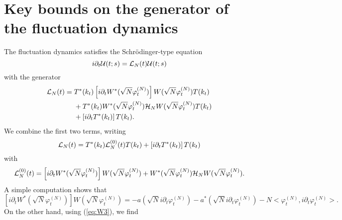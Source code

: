 \documentclass[11pt,a4paper]{article}
\newcommand{\done}{}
\newcommand{\cU}{{\cal U}}
\newcommand{\cH}{{\cal H}}
\newcommand{\cL}{{\cal L}}
\newcommand{\scal}[2]{\big<#1,#2\big>} %
\renewcommand{\Im}{\operatorname{Im}\,} 	%
\newcommand{\ph}{\varphi_t^{(N)}}	%
\begin{document}
\section{Key bounds on the generator of the fluctuation dynamics}
\label{sec:gen-fd}

The fluctuation dynamics satisfies the Schr\"odinger-type equation
\[ i\partial_t \cU (t;s) = \cL_N (t) \cU (t;s) \]
with the generator
\[ \begin{split} \cL_N (t) = \; &T^* (k_t) \left[ i \partial_t W^* (\sqrt{N} \varphi_t^{(N)}) \right] W(\sqrt{N} \varphi_t^{(N)}) T (k_t) \\ &+ T^* (k_t) W^* (\sqrt{N} \varphi_t^{(N)}) \cH_N W (\sqrt{N} \varphi_t^{(N)}) T (k_t) \\ &+ \left[ i \partial_t T^* (k_t) \right] T(k_t).  \end{split} \]
We combine the first two terms, writing
\begin{equation}\label{eq:cLN} \cL_N (t) = T^* (k_t) \cL^{(0)}_N (t) T (k_t) + \left[ i \partial_t T^* (k_t) \right] T(k_t)  
\end{equation}
with 
\[ \cL_N^{(0)} (t) =  \left[ i \partial_t W^* (\sqrt{N} \varphi_t^{(N)}) \right] W(\sqrt{N} \varphi_t^{(N)}) + 
W^* (\sqrt{N} \varphi_t^{(N)}) \cH_N W (\sqrt{N} \varphi_t^{(N)}). \]
A simple computation shows that
\begin{displaymath}
 \left[ i \partial_t W^* (\sqrt{N} \varphi_t^{(N)}) \right] W(\sqrt{N}
 \varphi_t^{(N)})%
= - a(\sqrt{N} i \partial_t \varphi_t^{(N)}) - a^*
 (\sqrt{N} i \partial_t \varphi_t^{(N)}) - N \scal{\ph}{i\partial_t \ph}.\done
\end{displaymath}
 On the other hand, using (\ref{eq:W3}), we find
\end{document}

